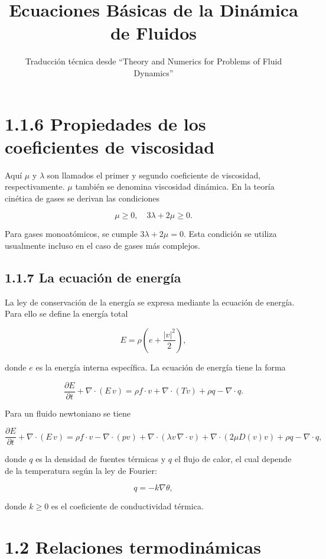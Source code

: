 \documentclass[12pt]{article}
\title{Ecuaciones Básicas de la Dinámica de Fluidos}
\author{Traducción técnica desde ``Theory and Numerics for Problems of Fluid Dynamics''}
\date{}
\begin{document}
\maketitle

\section*{1.1.6 Propiedades de los coeficientes de viscosidad}

Aquí $\mu$ y $\lambda$ son llamados el primer y segundo coeficiente de viscosidad, respectivamente. $\mu$ también se denomina viscosidad dinámica. En la teoría cinética de gases se derivan las condiciones

\[
\mu \geq 0, \quad 3\lambda + 2\mu \geq 0.
\]

Para gases monoatómicos, se cumple $3\lambda + 2\mu = 0$. Esta condición se utiliza usualmente incluso en el caso de gases más complejos.

\subsection*{1.1.7 La ecuación de energía}

La ley de conservación de la energía se expresa mediante la ecuación de energía. Para ello se define la energía total

\[
E = \rho\left(e + \frac{|v|^2}{2}\right),
\]

donde $e$ es la energía interna específica. La ecuación de energía tiene la forma

\[
\frac{\partial E}{\partial t} + \nabla \cdot (E \, v) = \rho f \cdot v + \nabla \cdot (T v) + \rho q - \nabla \cdot q.
\]

Para un fluido newtoniano se tiene

\[
\frac{\partial E}{\partial t} + \nabla \cdot (E \, v) = \rho f \cdot v - \nabla \cdot (p v) + \nabla \cdot (\lambda v \, \nabla \cdot v) + \nabla \cdot (2\mu D(v)v) + \rho q - \nabla \cdot q,
\]

donde $q$ es la densidad de fuentes térmicas y $q$ el flujo de calor, el cual depende de la temperatura según la ley de Fourier:

\[
q = -k \nabla \theta,
\]

donde $k \geq 0$ es el coeficiente de conductividad térmica.

\section*{1.2 Relaciones termodinámicas}
\end{document}
